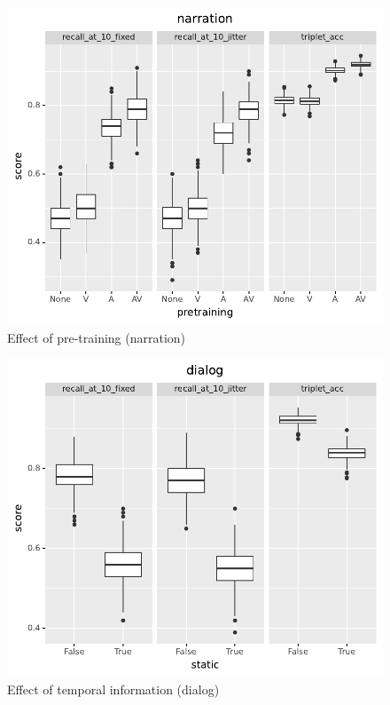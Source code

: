  \begin{figure}
  \centering
  \includegraphics[width=\textwidth]{results/slides/pretraining_narration.pdf}
  \caption{Effect of pre-training (narration)}
  \label{fig:pretraining-narration}
\end{figure}

\begin{figure}
  \centering
  \includegraphics[width=\textwidth]{results/slides/static_dialog.pdf}
  \caption{Effect of temporal information (dialog)}
  \label{fig:static-dialog}
\end{figure}

